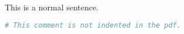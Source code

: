 \documentclass{article}
\begin{document}
    This is a normal sentence.
    \begin{lstlisting}[language=Python]
        # This comment is not indented in the pdf.
    \end{lstlisting}
\end{document}
